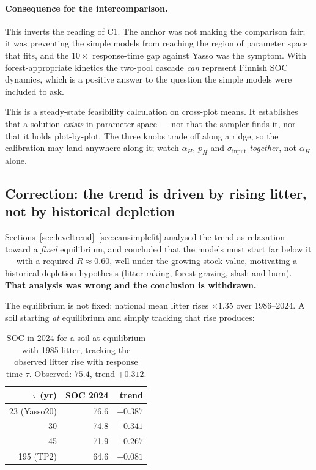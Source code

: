 \documentclass[11pt]{article}
\newcommand{\sinput}{\sigma_{\mathrm{input}}}
\begin{document}
\paragraph{Consequence for the intercomparison.} This inverts the reading of C1. The anchor was
not making the comparison fair; it was preventing the simple models from reaching the region of
parameter space that fits, and the $10\times$ response-time gap against Yasso was the symptom.
With forest-appropriate kinetics the two-pool cascade \emph{can} represent Finnish SOC dynamics,
which is a positive answer to the question the simple models were included to ask.

\begin{caveat}
This is a steady-state feasibility calculation on cross-plot means. It establishes that a
solution \emph{exists} in parameter space --- not that the sampler finds it, nor that it holds
plot-by-plot. The three knobs trade off along a ridge, so the calibration may land anywhere
along it; watch $\alpha_H$, $p_H$ and $\sinput$ \emph{together}, not $\alpha_H$ alone.
\end{caveat}

\subsection{Correction: the trend is driven by rising litter, not by historical depletion}
\label{sec:rising}

Sections~\ref{sec:leveltrend}--\ref{sec:cansimplefit} analysed the trend as relaxation toward a
\emph{fixed} equilibrium, and concluded that the models must start far below it --- with a
required $R \approx 0.60$, well under the growing-stock value, motivating a historical-depletion
hypothesis (litter raking, forest grazing, slash-and-burn). \textbf{That analysis was wrong and
the conclusion is withdrawn.}

The equilibrium is not fixed: national mean litter rises $\times 1.35$ over 1986--2024. A soil
starting \emph{at} equilibrium and simply tracking that rise produces:

\begin{table}[H]\centering\small
\caption{SOC in 2024 for a soil at equilibrium with 1985 litter, tracking the observed litter
rise with response time $\tau$. Observed: $75.4$, trend $+0.312$.}
\begin{tabular}{rrr}
\toprule
$\tau$ (yr) & SOC 2024 & trend\\
\midrule
23 (Yasso20)  & 76.6 & $+0.387$\\
30            & 74.8 & $+0.341$\\
45            & 71.9 & $+0.267$\\
195 (TP2)     & 64.6 & $+0.081$\\
\bottomrule
\end{tabular}
\end{table}
\end{document}

